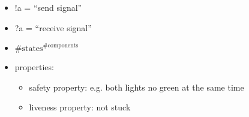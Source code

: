 \documentclass[11pt, landscape, a4paper]{article}
\begin{document}
\flower
\color{PrimaryColorDimmed}
\begin{minipage}{0.33\pagewidth}
  \begin{turn}{1}
    \begin{minipage}{\linewidth}
      \raggedright
      \begin{itemize}
        \item[\raisebox{1.5pt}{.}] !a = \enquote{send signal}
        \item[\raisebox{2.5pt}{.}] ?a = \enquote{receive signal}
        \item[\raisebox{2.5pt}{.}] $\text{\#states}^{\text{\#components}}$
        \item[\raisebox{1.5pt}{.}] \alert{properties:}
        \begin{itemize}
          \item[\raisebox{1.5pt}{.}] \alert{safety property:} e.g. both lights no green at the same time
          \item[\raisebox{2.5pt}{.}] \alert{liveness property:} not stuck
        \end{itemize}
      \end{itemize}
    \end{minipage}
  \end{turn}
  \begin{turn}{1}
    \begin{minipage}{\linewidth}
      \raggedright
    \end{minipage}
  \end{turn}
\end{minipage}
\begin{minipage}{0.33\pagewidth}
  \begin{turn}{1}
    \begin{minipage}{\linewidth}
      \raggedright
    \end{minipage}
  \end{turn}
  \begin{turn}{1}
    \begin{minipage}{\linewidth}
      \raggedright
    \end{minipage}
  \end{turn}
\end{minipage}
\begin{minipage}{0.33\pagewidth}
  \begin{turn}{1}
    \begin{minipage}{\linewidth}
      \raggedright
    \end{minipage}
  \end{turn}
  \begin{turn}{1}
    \begin{minipage}{\linewidth}
      \raggedright
    \end{minipage}
  \end{turn}
\end{minipage}
\end{document}
